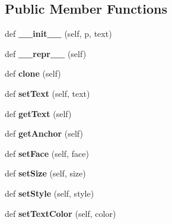 \subsection*{Public Member Functions}
\begin{DoxyCompactItemize}
\item 
\mbox{\label{classgraphics_1_1_text_af17676ed39bcc03a78098b22a15ef591}} 
def {\bfseries \+\_\+\+\_\+init\+\_\+\+\_\+} (self, p, text)
\item 
\mbox{\label{classgraphics_1_1_text_ae0b4ff4a08c45410d4f424a48a6eba59}} 
def {\bfseries \+\_\+\+\_\+repr\+\_\+\+\_\+} (self)
\item 
\mbox{\label{classgraphics_1_1_text_a507a4eea3a7a7de19bfe30ff70cf8fd6}} 
def {\bfseries clone} (self)
\item 
\mbox{\label{classgraphics_1_1_text_ab8a97b69fe919acb98429b7da81b7d37}} 
def {\bfseries set\+Text} (self, text)
\item 
\mbox{\label{classgraphics_1_1_text_a1697a465c237e26532f43cef1af6abe5}} 
def {\bfseries get\+Text} (self)
\item 
\mbox{\label{classgraphics_1_1_text_a02525bc36e0af653d17905cd733d0843}} 
def {\bfseries get\+Anchor} (self)
\item 
\mbox{\label{classgraphics_1_1_text_ae58860c5531b95e69136a819489a3169}} 
def {\bfseries set\+Face} (self, face)
\item 
\mbox{\label{classgraphics_1_1_text_a31ea18b7a09603cdb49a4716290ec8fe}} 
def {\bfseries set\+Size} (self, size)
\item 
\mbox{\label{classgraphics_1_1_text_af2697684710c7471abe9bc8bf0f5fffe}} 
def {\bfseries set\+Style} (self, style)
\item 
\mbox{\label{classgraphics_1_1_text_a4ee730f2d0f9a81250b8ca232940fec8}} 
def {\bfseries set\+Text\+Color} (self, color)
\end{DoxyCompactItemize}
